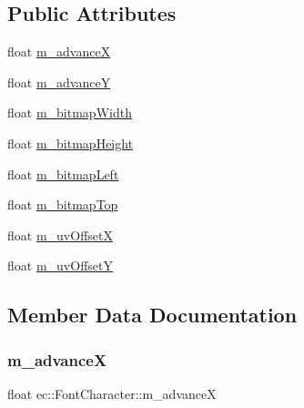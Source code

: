 \subsection*{Public Attributes}
\begin{DoxyCompactItemize}
\item 
float \mbox{\hyperlink{structec_1_1_font_character_a3dfcbeba30562b00daf057ac7d23c762}{m\+\_\+advanceX}}
\item 
float \mbox{\hyperlink{structec_1_1_font_character_afea51e45e05b1ac9bcf351184dde2286}{m\+\_\+advanceY}}
\item 
float \mbox{\hyperlink{structec_1_1_font_character_a29e1802582b887199a7c3484f7e99b09}{m\+\_\+bitmap\+Width}}
\item 
float \mbox{\hyperlink{structec_1_1_font_character_a4ab090e6a8358c152e94a931fe651423}{m\+\_\+bitmap\+Height}}
\item 
float \mbox{\hyperlink{structec_1_1_font_character_a5f666f5036f0ddf417c1b1e3475e433c}{m\+\_\+bitmap\+Left}}
\item 
float \mbox{\hyperlink{structec_1_1_font_character_a1555f3f60ade4c5a6a22f73d68710958}{m\+\_\+bitmap\+Top}}
\item 
float \mbox{\hyperlink{structec_1_1_font_character_a13e3f7cbc190b61581c6909bff262133}{m\+\_\+uv\+OffsetX}}
\item 
float \mbox{\hyperlink{structec_1_1_font_character_ac48d060931b82412610d9749b1374db3}{m\+\_\+uv\+OffsetY}}
\end{DoxyCompactItemize}


\subsection{Member Data Documentation}
\mbox{\label{structec_1_1_font_character_a3dfcbeba30562b00daf057ac7d23c762}} 
\subsubsection{\texorpdfstring{m\+\_\+advanceX}{m\_advanceX}}
{\footnotesize\ttfamily float ec\+::\+Font\+Character\+::m\+\_\+advanceX}

\mbox{\label{structec_1_1_font_character_afea51e45e05b1ac9bcf351184dde2286}} 
